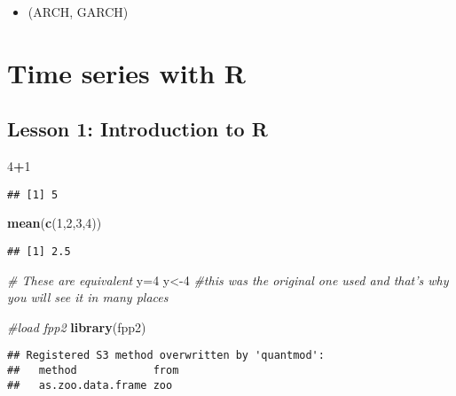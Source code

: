 \documentclass[]{book}
\newenvironment{Shaded}{\begin{snugshade}}{\end{snugshade}}
\newcommand{\CommentTok}[1]{\textcolor[rgb]{0.56,0.35,0.01}{\textit{#1}}}
\newcommand{\DecValTok}[1]{\textcolor[rgb]{0.00,0.00,0.81}{#1}}
\newcommand{\KeywordTok}[1]{\textcolor[rgb]{0.13,0.29,0.53}{\textbf{#1}}}
\newcommand{\NormalTok}[1]{#1}
\newcommand{\OperatorTok}[1]{\textcolor[rgb]{0.81,0.36,0.00}{\textbf{#1}}}
\providecommand{\tightlist}{%
  \setlength{\itemsep}{0pt}\setlength{\parskip}{0pt}}
\begin{document}
\begin{itemize}
\tightlist
\item
  (ARCH, GARCH)
\end{itemize}

\hypertarget{time-series-with-r}{%
\chapter{Time series with R}\label{time-series-with-r}}

\hypertarget{lesson-1-introduction-to-r}{%
\section{Lesson 1: Introduction to R}\label{lesson-1-introduction-to-r}}

\begin{Shaded}
\begin{Highlighting}[]
\DecValTok{4}\OperatorTok{+}\DecValTok{1}
\end{Highlighting}
\end{Shaded}

\begin{verbatim}
## [1] 5
\end{verbatim}

\begin{Shaded}
\begin{Highlighting}[]
\KeywordTok{mean}\NormalTok{(}\KeywordTok{c}\NormalTok{(}\DecValTok{1}\NormalTok{,}\DecValTok{2}\NormalTok{,}\DecValTok{3}\NormalTok{,}\DecValTok{4}\NormalTok{))}
\end{Highlighting}
\end{Shaded}

\begin{verbatim}
## [1] 2.5
\end{verbatim}

\begin{Shaded}
\begin{Highlighting}[]
\CommentTok{# These are equivalent}
\NormalTok{y=}\DecValTok{4}
\NormalTok{y<-}\DecValTok{4} \CommentTok{#this was the original one used and that's why you will see it in many places}

\CommentTok{#load fpp2}
\KeywordTok{library}\NormalTok{(fpp2)}
\end{Highlighting}
\end{Shaded}

\begin{verbatim}
## Registered S3 method overwritten by 'quantmod':
##   method            from
##   as.zoo.data.frame zoo
\end{verbatim}
\end{document}
